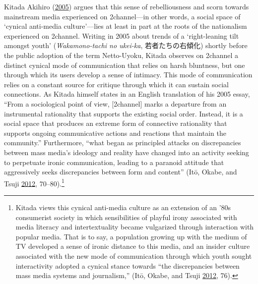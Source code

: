 \documentclass[10pt,british,A4paper,oneside]{memoir}
\begin{document}
Kitada Akihiro (\protect\hyperlink{ref-kitada_eng:_2005}{2005}) argues that this
sense of rebelliousness and scorn towards mainstream media experienced
on 2channel---in other words, a social space of `cynical anti-media
culture'---lies at least in part at the roots of the nationalism
experienced on 2channel. Writing in 2005 about trends of a
`right-leaning tilt amongst youth' (\emph{Wakamono-tachi no ukei-ka},
若者たちの右傾化) shortly before the public adoption of the term
Netto-Uyoku, Kitada observes on 2channel a distinct cynical mode of
communication that relies on harsh bluntness, but one through which its
users develop a sense of intimacy. This mode of communication relies on
a constant source for critique through which it can sustain social
connections. As Kitada himself states in an English translation of his
2005 essay, ``From a sociological point of view, {[}2channel{]} marks a
departure from an instrumental rationality that supports the existing
social order. Instead, it is a social space that produces an extreme
form of connective rationality that supports ongoing communicative
actions and reactions that maintain the community.'' Furthermore, ``what
began as principled attacks on discrepancies between mass media's
ideology and reality have changed into an activity seeking to perpetuate
ironic communication, leading to a paranoid attitude that aggressively
seeks discrepancies between form and content'' (Itō, Okabe, and Tsuji
\protect\hyperlink{ref-ito_fandom_2012}{2012}, 70--80).\footnote{Kitada
  views this cynical anti-media culture as an extension of an '80s
  consumerist society in which sensibilities of playful irony associated
  with media literacy and intertextuality became vulgarized through
  interaction with popular media. That is to say, a population growing
  up with the medium of TV developed a sense of ironic distance to this
  media, and an insider culture associated with the new mode of
  communication through which youth sought interactivity adopted a
  cynical stance towards ``the discrepancies between mass media systems
  and journalism,'' (Itō, Okabe, and Tsuji
  \protect\hyperlink{ref-ito_fandom_2012}{2012}, 76).}
\end{document}
